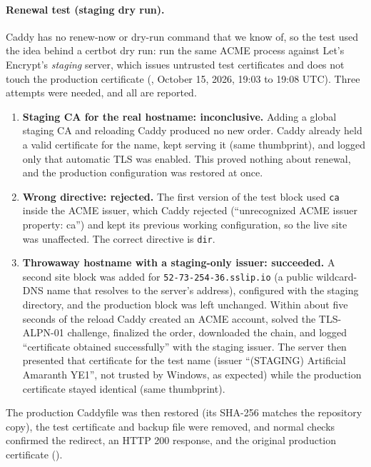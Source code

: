 \paragraph{Renewal test (staging dry run).}
Caddy has no renew-now or dry-run command that we know of, so the test used the
idea behind a certbot dry run: run the same ACME process against Let's
Encrypt's \emph{staging} server, which issues untrusted test certificates and
does not touch the production certificate (, October 15, 2026,
19:03 to 19:08 UTC). Three attempts were needed, and all are reported.
\begin{enumerate}[nosep]
  \item \textbf{Staging CA for the real hostname: inconclusive.} Adding a global staging CA and reloading Caddy produced no new order. Caddy already held a valid certificate for the name, kept serving it (same thumbprint), and logged only that automatic TLS was enabled. This proved nothing about renewal, and the production configuration was restored at once.
  \item \textbf{Wrong directive: rejected.} The first version of the test block used \texttt{ca} inside the ACME issuer, which Caddy rejected (``unrecognized ACME issuer property: ca'') and kept its previous working configuration, so the live site was unaffected. The correct directive is \texttt{dir}.
  \item \textbf{Throwaway hostname with a staging-only issuer: succeeded.} A second site block was added for \texttt{52-73-254-36.sslip.io} (a public wildcard-DNS name that resolves to the server's address), configured with the staging directory, and the production block was left unchanged. Within about five seconds of the reload Caddy created an ACME account, solved the TLS-ALPN-01 challenge, finalized the order, downloaded the chain, and logged ``certificate obtained successfully'' with the staging issuer. The server then presented that certificate for the test name (issuer ``(STAGING) Artificial Amaranth YE1'', not trusted by Windows, as expected) while the production certificate stayed identical (same thumbprint).
\end{enumerate}
The production Caddyfile was then restored (its SHA-256 matches the repository
copy), the test certificate and backup file were removed, and normal checks
confirmed the redirect, an HTTP 200 response, and the original production
certificate ().

\begin{longlisting}
\inputminted[fontsize=\scriptsize]{text}{../evidence/42-caddy-acme-staging-issuance-test-2026-10-15.txt}
\caption{The staging dry run, with all three attempts, the restore, and the final checks, October 15, 2026, 19:03 to 19:08 UTC (real output; remote addresses masked).}
\label{Listing:E42}
\end{longlisting}

